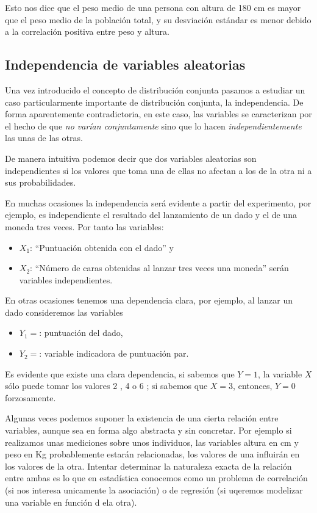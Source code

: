 \documentclass[
]{article}
\providecommand{\tightlist}{%
  \setlength{\itemsep}{0pt}\setlength{\parskip}{0pt}}
\begin{document}
Esto nos dice que el peso medio de una persona con altura de 180 cm es mayor que el peso medio de la población total, y su desviación estándar es menor debido a la correlación positiva entre peso y altura.

\subsection{Independencia de variables aleatorias}\label{independencia-de-variables-aleatorias}

Una vez introducido el concepto de distribución conjunta pasamos a estudiar un caso particularmente importante de distribución conjunta, la independencia.
De forma aparentemente contradictoria, en este caso, las variables se caracterizan por el hecho de que \emph{no varían conjuntamente} sino que lo hacen \emph{independientemente} las unas de las otras.

De manera intuitiva podemos decir que dos variables aleatorias son independientes si los valores que toma una de ellas no afectan a los de la otra ni a sus probabilidades.

En muchas ocasiones la independencia será evidente a partir del experimento, por ejemplo, es independiente el resultado del lanzamiento de un dado y el de una moneda tres veces. Por tanto las variables:

\begin{itemize}
\tightlist
\item
  \(X_1\): ``Puntuación obtenida con el dado'' y
\item
  \(X_2\): ``Número de caras obtenidas al lanzar tres veces una moneda'' serán variables independientes.
\end{itemize}

En otras ocasiones tenemos una dependencia clara, por ejemplo, al lanzar un dado consideremos las variables

\begin{itemize}
\tightlist
\item
  \(Y_1=\): puntuación del dado,
\item
  \(Y_2=\): variable indicadora de puntuación par.
\end{itemize}

Es evidente que existe una clara dependencia, si sabemos que \(Y=1\), la variable \(X\) sólo puede tomar los valores 2 , 4 o 6 ; si sabemos que \(X=3\), entonces, \(Y=0\) forzosamente.

Algunas veces podemos suponer la existencia de una cierta relación entre variables, aunque sea en forma algo abstracta y sin concretar. Por ejemplo si realizamos unas mediciones sobre unos individuos, las variables altura en cm y peso en Kg probablemente estarán relacionadas, los valores de una influirán en los valores de la otra. Intentar determinar la naturaleza exacta de la relación entre ambas es lo que en estadística conocemos como un problema de correlación (si nos interesa unicamente la asociación) o de regresión (si uqeremos modelizar una variable en función d ela otra).
\end{document}
